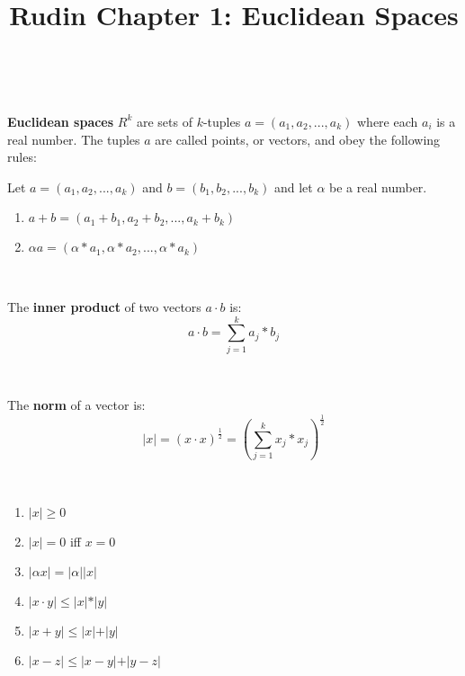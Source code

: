 \documentclass{article}
\title{Rudin Chapter 1: Euclidean Spaces}
\begin{document}
\maketitle

\begin{definition}
\

\textbf{Euclidean spaces} $R^k$ are sets of $k$-tuples $a = (a_1, a_2, ..., a_k)$ where each $a_i$ is a real number. The tuples $a$ are called points, or vectors, and obey the following rules:

Let $a = (a_1, a_2, ..., a_k)$ and $b = (b_1, b_2, ..., b_k)$ and let $\alpha$ be a real number.

\begin{enumerate}
    \item $a+b = (a_1 + b_1, a_2 + b_2, ..., a_k+b_k)$
    \item $\alpha a = (\alpha * a_1, \alpha * a_2, ..., \alpha * a_k)$
\end{enumerate}
\end{definition}

\begin{definition}
\

The \textbf{inner product} of two vectors $a \cdot b$ is: $$a \cdot b = \sum_{j=1}^k a_j* b_j$$ 
\end{definition}

\begin{definition}[Norm]
\

The \textbf{norm} of a vector is: $$\vert x \vert = (x \cdot x)^\frac{1}{2} = (\sum_{j=1}^k x_j * x_j)^{\frac{1}{2}}$$
\end{definition}

\begin{theorem}
\

\begin{enumerate}
    \item $\vert x\vert \geq 0$
    \item $\vert x\vert = 0$ iff $x = 0$
    \item $\vert \alpha x \vert = \vert \alpha \vert \vert x\vert$
    \item $\vert x \cdot y\vert \leq \vert x\vert * \vert y\vert$
    \item $\vert x+y\vert \leq \vert x\vert + \vert y\vert$
    \item $\vert x-z\vert \leq \vert x - y\vert + \vert y-z\vert$                
\end{enumerate}
\end{theorem}
\end{document}
